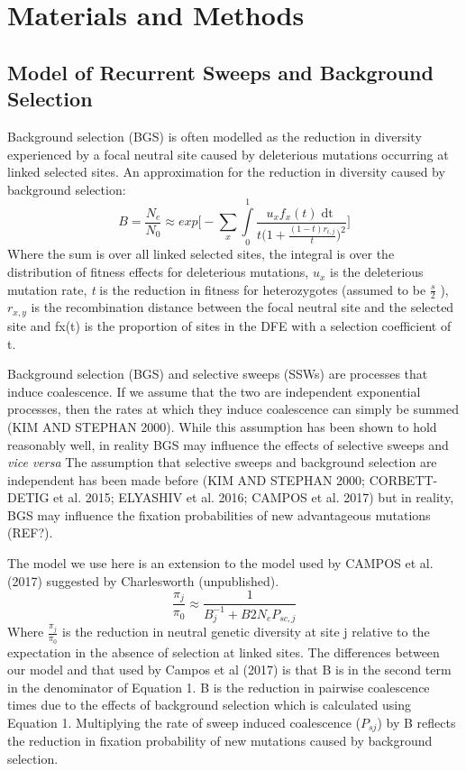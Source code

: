 \documentclass[11pt]{article}
\begin{document}
\section*{Materials and Methods}

	\subsection*{Model of Recurrent Sweeps and Background Selection}
Background selection (BGS) is often modelled as the reduction in diversity experienced by a focal neutral site caused by deleterious mutations occurring at linked selected sites. An approximation for the reduction in diversity caused by background selection:
\begin{equation}
B = \frac{N_{e}}{N_{0}} \approx exp\Bigg[- \sum \limits_{x} \int \limits_{0}^1 \frac{u_{x}f_x(t)\mathop{dt}}{t \Big( 1 + \frac{(1-t)r_{i,j}}{t} \Big)^2} \Bigg]
\end{equation}
Where the sum is over all linked selected sites, the integral is over the distribution of fitness effects for deleterious mutations, \emph{$u_{x}$} is the deleterious mutation rate, \emph{t} is the reduction in fitness for heterozygotes (assumed to be \(\frac{s}{2}\) ), $r_{x,y}$  is the recombination distance between the focal neutral site and the selected site and fx(t) is the proportion of sites in the DFE with a selection coefficient of t.

	Background selection (BGS) and selective sweeps (SSWs) are processes that induce coalescence. If we assume that the two are independent exponential processes, then the rates at which they induce coalescence can simply be summed (KIM AND STEPHAN 2000). While this assumption has been shown to hold reasonably well, in reality BGS may influence the effects of selective sweeps and \emph{vice versa}
	The assumption that selective sweeps and background selection are independent has been made before (KIM AND STEPHAN 2000; CORBETT-DETIG et al. 2015; ELYASHIV et al. 2016; CAMPOS et al. 2017) but in reality, BGS may influence the fixation probabilities of new advantageous mutations (REF?). 

The model we use here is an extension to the model used by CAMPOS et al. (2017) suggested by Charlesworth (unpublished). 
\begin{equation}
\frac{\pi_{j}}{\pi_{0}} \approx  \frac{1}{B_{j}^{-1}  + B2N_eP_{sc,j}}
\end{equation}
	Where \(\frac{\pi_{j}}{\pi_{0}}\) is the reduction in neutral genetic diversity at site j relative to the expectation in the absence of selection at linked sites. The differences between our model and that used by Campos et al (2017) is that B is in the second term in the denominator of Equation 1. B is the reduction in pairwise coalescence times due to the effects of background selection which is calculated using Equation 1. Multiplying the rate of sweep induced coalescence ($P_{sj}$) by B reflects the reduction in fixation probability of new mutations caused by background selection. 
\end{document}
